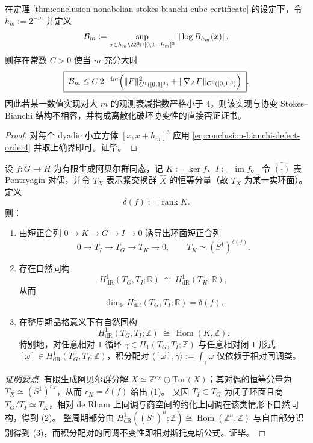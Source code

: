 \begin{corollary}\label{cor:conclusion-nonabelian-bianchi-dyadic-audit-threshold}
在定理 \ref{thm:conclusion-nonabelian-stokes-bianchi-cube-certificate} 的设定下，令 \(h_m:=2^{-m}\) 并定义
\[
\mathcal B_m
:=\sup_{x\in h_m\ZZ^{3}\cap[0,1-h_m]^3}\|\log B_{h_m}(x)\|.
\]
则存在常数 \(C>0\) 使当 \(m\) 充分大时
\[
\boxed{\;
\mathcal B_m
\le
C\,2^{-4m}\Bigl(\|F\|_{C^1([0,1]^3)}^{2}+\|\nabla_A F\|_{C^0([0,1]^3)}\Bigr)\; }.
\]
因此若某一数值实现对大 \(m\) 的观测衰减指数严格小于 \(4\)，则该实现与协变 Stokes--Bianchi 结构不相容，并构成离散化破坏协变性的直接否证证书。
\end{corollary}
\begin{proof}
对每个 dyadic 小立方体 \([x,x+h_m]^3\) 应用 \eqref{eq:conclusion-bianchi-defect-order4} 并取上确界即可。证毕。
\end{proof}

\begin{theorem}\label{thm:conclusion-relative-stokes-torus-defect}
设 \(f:G\to H\) 为有限生成阿贝尔群同态，记 \(K:=\ker f\)、\(I:=\operatorname{im}f\)。
令 \(\widehat{(\cdot)}\) 表 Pontryagin 对偶，并令 \(T_X\) 表示紧交换群 \(\widehat X\) 的恒等分量（故 \(T_X\) 为某一实环面）。
定义
\[
\delta(f):=\operatorname{rank}K.
\]
则：
\begin{enumerate}
  \item 由短正合列 \(0\to K\to G\to I\to 0\) 诱导出环面短正合列
  \[
  0\longrightarrow T_I\longrightarrow T_G\longrightarrow T_K\longrightarrow 0,
  \qquad
  T_K\simeq (S^1)^{\delta(f)}.
  \]
  \item 存在自然同构
  \[
  H^1_{\mathrm{dR}}(T_G,T_I;\mathbb R)\ \cong\ H^1_{\mathrm{dR}}(T_K;\mathbb R),
  \]
  从而
  \[
  \dim_{\mathbb R}H^1_{\mathrm{dR}}(T_G,T_I;\mathbb R)=\delta(f).
  \]
  \item 在整周期晶格意义下有自然同构
  \[
  H^1_{\mathrm{dR}}(T_G,T_I;\mathbb Z)\ \cong\ \operatorname{Hom}(K,\mathbb Z).
  \]
  特别地，对任意相对 \(1\)-循环 \(\gamma\in H_1(T_G,T_I;\mathbb Z)\) 与任意相对闭 \(1\)-形式
  \([\omega]\in H^1_{\mathrm{dR}}(T_G,T_I;\mathbb Z)\)，积分配对
  \(
  \langle[\omega],\gamma\rangle:=\int_\gamma\omega
  \)
  仅依赖于相对同调类。
\end{enumerate}
\end{theorem}
\begin{proof}[证明要点]
有限生成阿贝尔群分解 \(X\simeq \mathbb Z^{r_X}\oplus \mathrm{Tor}(X)\)；其对偶的恒等分量为 \(T_X\simeq (S^1)^{r_X}\)，从而 \(r_K=\delta(f)\) 给出 (1)。
又因 \(T_I\subset T_G\) 为闭子环面且商 \(T_G/T_I\simeq T_K\)，相对 de Rham 上同调与商空间的约化上同调在该类情形下自然同构，得到 (2)。
整周期部分由
\(
H^1_{\mathrm{dR}}((S^1)^n;\mathbb Z)\cong \operatorname{Hom}(\mathbb Z^n,\mathbb Z)
\)
与自由部分识别得到 (3)，而积分配对的同调不变性即相对斯托克斯公式。证毕。
\end{proof}

